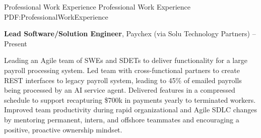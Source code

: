 \documentclass[MMMMyyyy,nonstopmode]{simpleresumecv_stacked}
\newcommand{\techsep}{/ }
\newcommand{\comment}[1]{\ignorespaces} %
\begin{document}
\begin{Body}
\comment{
Staff Software Engineer with track record of multiple successes in building robust systems, mentoring, and making teams more productive.
Adept at partnering with people and teams to solve complex business challenges.
}





\Section
{Professional Work Experience}
{Professional Work Experience}
{PDF:ProfessionalWorkExperience}

\Entry
\textbf{Lead Software/Solution Engineer}, Paychex (via Solu Technology Partners)
\hfill
{} -- Present

\begin{Detail}
Leading an Agile team of SWEs and SDETs to deliver functionality for a large payroll processing system.
\Gap
\BulletItem
Led team with cross-functional partners to create REST interfaces to legacy payroll system, leading to 45\% of emailed payrolls being processed by an AI service agent.
\BulletItem
Delivered features in a compressed schedule to support recapturing \$700k in payments yearly to terminated workers.
\BulletItem
Improved team productivity during rapid organizational and Agile SDLC changes by mentoring permanent, intern, and offshore teammates and encouraging a positive, proactive ownership mindset.
\end{Detail}



\end{Body}
\end{document}

